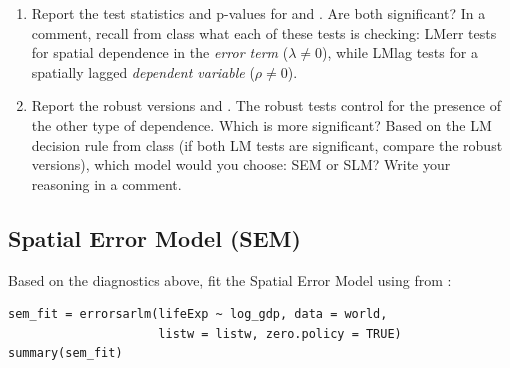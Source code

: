 \begin{enumerate}[label=\alph*)]

  \item Report the test statistics and p-values for  and . Are both significant? In a comment, recall from class what each of these tests is checking: LMerr tests for spatial dependence in the \textit{error term} ($\lambda \neq 0$), while LMlag tests for a spatially lagged \textit{dependent variable} ($\rho \neq 0$).

  \item Report the robust versions  and . The robust tests control for the presence of the other type of dependence. Which is more significant? Based on the LM decision rule from class (if both LM tests are significant, compare the robust versions), which model would you choose: SEM or SLM? Write your reasoning in a comment.

\end{enumerate}

\subsection{Spatial Error Model (SEM)}

Based on the diagnostics above, fit the Spatial Error Model using  from :

\begin{lstlisting}
sem_fit = errorsarlm(lifeExp ~ log_gdp, data = world,
                     listw = listw, zero.policy = TRUE)
summary(sem_fit)
\end{lstlisting}

